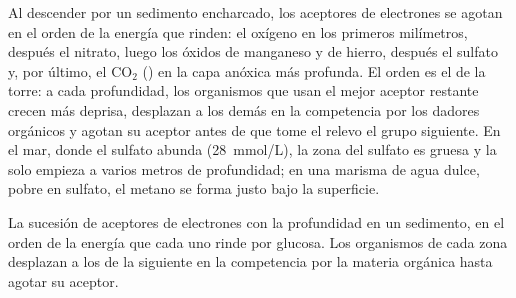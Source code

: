 \begin{proposition}\label{prop:b2:microbial-metabolism:sequence}
Al descender por un sedimento encharcado, los aceptores de electrones se
agotan en el orden de la energía que rinden: el oxígeno en los primeros
milímetros, después el nitrato, luego los óxidos de manganeso y de hierro,
después el sulfato y, por último, el $\mathrm{CO_2}$ () en la
capa anóxica más profunda. El orden es el de la torre: a cada
profundidad, los organismos que usan el mejor aceptor restante crecen
más deprisa, desplazan a los demás en la competencia por los dadores
orgánicos y agotan su aceptor antes de que tome el relevo el grupo
siguiente. En el mar, donde el sulfato abunda (\qty{28}{mmol/L}), la zona
del sulfato es gruesa y la  solo empieza a varios metros de
profundidad; en una marisma de agua dulce, pobre en sulfato, el metano se
forma justo bajo la superficie.
\end{proposition}
\begin{omfigure}

{\small La sucesión de aceptores de electrones con la profundidad en un
sedimento, en el orden de la energía que cada uno rinde por glucosa. Los
organismos de cada zona desplazan a los de la siguiente en la competencia
por la materia orgánica hasta agotar su aceptor.}
\end{omfigure}

